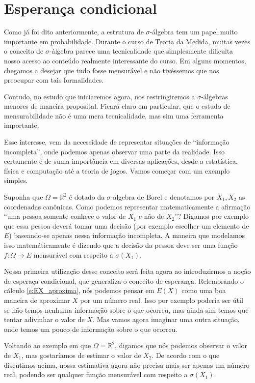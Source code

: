 \section{Esperança condicional}

Como já foi dito anteriormente, a estrutura de $\sigma$-álgebra tem um papel muito importante em probabilidade.
Durante o curso de Teoria da Medida, muitas vezes o conceito de $\sigma$-álgebra parece uma tecnicalidade que simplesmente dificulta nosso acesso ao conteúdo realmente interessante do curso.
Em alguns momentos, chegamos a desejar que tudo fosse mensurável e não tivéssemos que nos preocupar com tais formalidades.

Contudo, no estudo que iniciaremos agora, nos restringiremos a $\sigma$-álgebras menores de maneira proposital.
Ficará claro em particular, que o estudo de mensurabilidade não é uma mera tecnicalidade, mas sim uma ferramenta importante.

Esse interesse, vem da necessidade de representar situações de ``informação incompleta'', onde podemos apenas observar uma parte da realidade.
Isso certamente é de suma importância em diversas aplicações, desde a estatística, física e computação até a teoria de jogos.
Vamos começar com um exemplo simples.

Suponha que $\Omega = \mathbb{R}^2$ é dotado da $\sigma$-álgebra de Borel e denotamos por $X_1, X_2$ as coordenadas canônicas.
Como podemos representar matematicamente a afirmação ``uma pessoa somente conhece o valor de $X_1$ e não de $X_2$''?
Digamos por exemplo que essa pessoa deverá tomar uma decisão (por exemplo escolher um elemento de $E$) baseando-se apenas nessa informação incompleta.
A maneira que modelamos isso matemáticamente é dizendo que a decisão da pessoa deve ser uma função $f: \Omega \to E$ mensurável com respeito a $\sigma(X_1)$.

Nossa primeira utilização desse conceito será feita agora ao introduzirmos a noção de esperaça condicional, que generaliza o conceito de esperança.
Relembrando o cálculo \eqref{e:EX_aproxima}, nós podemos pensar em $E(X)$ como uma boa maneira de aproximar $X$ por um número real.
Isso por exemplo poderia ser útil se não temos nenhuma informação sobre o que ocorreu, mas ainda sim temos que tentar adivinhar o valor de $X$.
Mas vamos agora imaginar uma outra situação, onde temos um pouco de informação sobre o que ocorreu.

Voltando ao exemplo em que $\Omega = \mathbb{R}^2$, digamos que nós podemos observar o valor de $X_1$, mas gostaríamos de estimar o valor de $X_2$.
De acordo com o que discutimos acima, nossa estimativa agora não precisa mais ser apenas um número real, podendo ser qualquer função mensurável com respeito a $\sigma(X_1)$.

